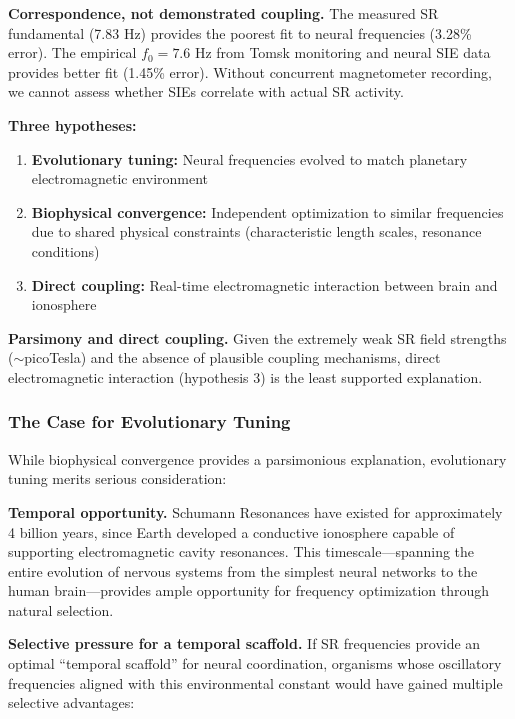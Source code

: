 \documentclass[11pt,a4paper]{article}
\begin{document}
\textbf{Correspondence, not demonstrated coupling.} The measured SR fundamental (7.83 Hz) provides the poorest fit to neural frequencies (3.28\% error). The empirical $f_0 = 7.6$ Hz from Tomsk monitoring and neural SIE data provides better fit (1.45\% error). Without concurrent magnetometer recording, we cannot assess whether SIEs correlate with actual SR activity.

\textbf{Three hypotheses:}
\begin{enumerate}
    \item \textbf{Evolutionary tuning:} Neural frequencies evolved to match planetary electromagnetic environment
    \item \textbf{Biophysical convergence:} Independent optimization to similar frequencies due to shared physical constraints (characteristic length scales, resonance conditions)
    \item \textbf{Direct coupling:} Real-time electromagnetic interaction between brain and ionosphere
\end{enumerate}

\textbf{Parsimony and direct coupling.} Given the extremely weak SR field strengths ($\sim$picoTesla) and the absence of plausible coupling mechanisms, direct electromagnetic interaction (hypothesis 3) is the least supported explanation.

\subsubsection{The Case for Evolutionary Tuning}

While biophysical convergence provides a parsimonious explanation, evolutionary tuning merits serious consideration:

\textbf{Temporal opportunity.} Schumann Resonances have existed for approximately 4 billion years, since Earth developed a conductive ionosphere capable of supporting electromagnetic cavity resonances. This timescale---spanning the entire evolution of nervous systems from the simplest neural networks to the human brain---provides ample opportunity for frequency optimization through natural selection.

\textbf{Selective pressure for a temporal scaffold.} If SR frequencies provide an optimal ``temporal scaffold'' for neural coordination, organisms whose oscillatory frequencies aligned with this environmental constant would have gained multiple selective advantages:
\end{document}
